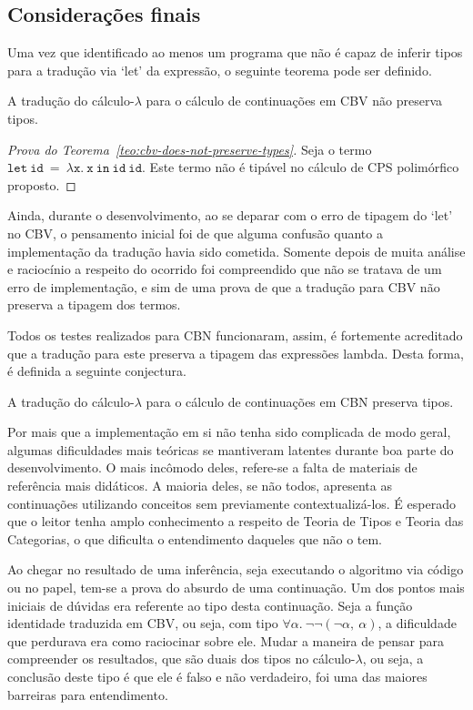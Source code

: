 \subsection{Considerações finais}
Uma vez que identificado ao menos um programa que não é capaz de inferir tipos para a tradução via `let' da expressão, o seguinte teorema pode ser definido.
\begin{teorema}\label{teo:cbv-does-not-preserve-types}
  A tradução do cálculo-$\lambda$ para o cálculo de continuações em CBV não preserva tipos.
\end{teorema}

\begin{proof}[Prova do Teorema~\ref{teo:cbv-does-not-preserve-types}]
  Seja o termo $\mathtt{let\ id\ =\ \lambda x.\ x\ in\ id\ id}$.
  Este termo não é tipável no cálculo de CPS polimórfico proposto.
  \qedhere
\end{proof}
\noindent Ainda, durante o desenvolvimento, ao se deparar com o erro de tipagem do `let' no CBV, o pensamento inicial foi de que alguma confusão quanto a implementação da tradução havia sido cometida.
Somente depois de muita análise e raciocínio a respeito do ocorrido foi compreendido que não se tratava de um erro de implementação, e sim de uma prova de que a tradução para CBV não preserva a tipagem dos termos.

Todos os testes realizados para CBN funcionaram, assim, é fortemente acreditado que a tradução para este preserva a tipagem das expressões lambda.
Desta forma, é definida a seguinte conjectura.
\begin{conjectura}\label{conj:cbn-preserve-types}
  A tradução do cálculo-$\lambda$ para o cálculo de continuações em CBN preserva tipos.
\end{conjectura}

Por mais que a implementação em si não tenha sido complicada de modo geral, algumas dificuldades mais teóricas se mantiveram latentes durante boa parte do desenvolvimento.
O mais incômodo deles, refere-se a falta de materiais de referência mais didáticos.
A maioria deles, se não todos, apresenta as continuações utilizando conceitos sem previamente contextualizá-los.
É esperado que o leitor tenha amplo conhecimento a respeito de Teoria de Tipos e Teoria das Categorias, o que dificulta o entendimento daqueles que não o tem.

Ao chegar no resultado de uma inferência, seja executando o algoritmo via código ou no papel, tem-se a prova do absurdo de uma continuação.
Um dos pontos mais iniciais de dúvidas era referente ao tipo desta continuação.
Seja a função identidade traduzida em CBV, ou seja, com tipo $\forall\alpha.\ \neg\neg(\neg\alpha,\ \alpha)$, a dificuldade que perdurava era como raciocinar sobre ele.
Mudar a maneira de pensar para compreender os resultados, que são duais dos tipos no cálculo-$\lambda$, ou seja, a conclusão deste tipo é que ele é falso e não verdadeiro, foi uma das maiores barreiras para entendimento.
